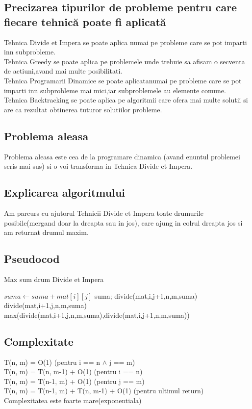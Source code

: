 \documentclass[runningheads]{llncs}
\begin{document}
\subsection{Precizarea tipurilor de probleme pentru care fiecare tehnică poate fi aplicată}
Tehnica Divide et Impera se poate aplica numai pe probleme care se pot imparti inn subprobleme.\\
Tehnica Greedy se poate aplica pe problemele unde trebuie sa afisam o secventa de actiuni,avand mai multe posibilitati.\\
Tehnica Programarii Dinamice se poate aplicatanumai pe probleme care se pot imparti inn subprobleme mai mici,iar subproblemele au elemente comune.\\
Tehnica Backtracking se poate aplica pe algoritmii care ofera mai multe solutii si are ca rezultat obtinerea tuturor solutiilor probleme.\\
\subsection{Problema aleasa}
Problema aleasa este cea de la programare dinamica (avand enuntul problemei scris mai sus) si o voi transforma in
Tehnica Divide et Impera.
\subsection{Explicarea algoritmului}
Am parcurs cu ajutorul Tehnicii Divide et Impera toate drumurile posibile(mergand doar la dreapta sau in jos),
care ajung in colrul dreapta jos si am returnat drumul maxim.
\subsection{Pseudocod}
\begin{algorithm}
\caption{Max sum drum Divide et Impera}\label{euclid}
\begin{algorithmic}[1]
\State $suma\gets suma+mat[i][j]$
\Return suma;
\EndIf 
{}
\Return divide(mat,i,j+1,n,m,suma)
\EndIf
{}
\Return divide(mat,i+1,j,n,m,suma)
\EndIf
\Return max(divide(mat,i+1,j,n,m,suma),divide(mat,i,j+1,n,m,suma))
\EndProcedure
\end{algorithmic}
\end{algorithm}
\subsection{Complexitate}
T(n, m) = O(1) (pentru i == n $\land$ j == m)\\
T(n, m) = T(n, m-1) + O(1) (pentru i == n)\\
T(n, m) = T(n-1, m) + O(1) (pentru j == m)\\
T(n, m) = T(n-1, m) + T(n, m-1) + O(1) (pentru ultimul return)\\
Complexitatea este foarte mare(exponentiala)\\
\end{document}
